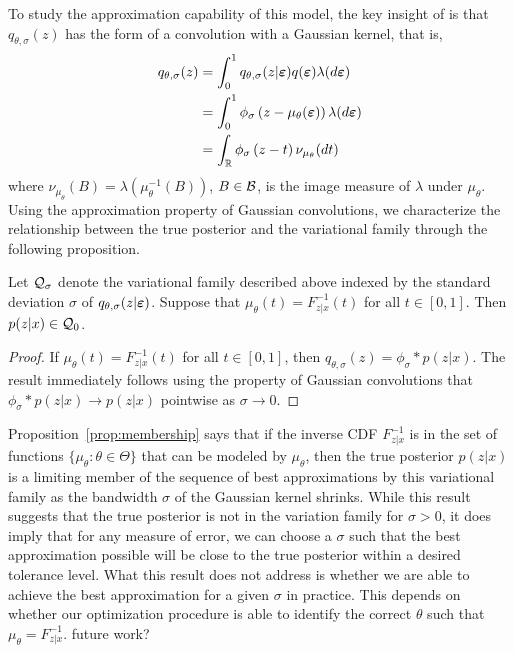 \documentclass[10pt]{article}
\begin{document}
To study the approximation capability of this model, the key insight of \citet{Plummer:2021} is that $q_{\theta,\sigma}(z)$ has the form of a convolution with a Gaussian kernel, that is,
\begin{align*}
q_{\theta,\sigma}(z) &= \int_0^1 q_{\theta,\sigma}(z|\bm{\varepsilon})q(\bm{\varepsilon})\lambda(d\bm{\varepsilon}) \\
&= \int_0^1 \phi_\sigma\left(z-\mu_\theta(\bm{\varepsilon})\right)\lambda(d\bm{\varepsilon}) \\
&= \int_{\mathbb{R}} \phi_\sigma\left(z-t\right)\nu_{\mu_\theta}(dt)
\end{align*}
where $\nu_{\mu_\theta}(B)=\lambda\left(\mu_\theta^{-1}(B)\right)$, $B\in\mathcal{B}$, is the image measure of $\lambda$ under $\mu_\theta$. Using the approximation property of Gaussian convolutions, we characterize the relationship between the true posterior and the variational family through the following proposition.

\begin{proposition} \label{prop:membership}
Let $\mathcal{Q}_\sigma$ denote the variational family described above indexed by the standard deviation $\sigma$ of $q_{\theta,\sigma}(z|\bm{\varepsilon})$. Suppose that $\mu_\theta(t)=F_{z|x}^{-1}(t)$ for all $t\in[0,1]$. Then $p(z|x)\in\mathcal{Q}_0$.
\end{proposition}
\begin{proof}
If $\mu_\theta(t)=F_{z|x}^{-1}(t)$ for all $t\in[0,1]$, then $q_{\theta,\sigma}(z) = \phi_\sigma*p(z|x)$. The result immediately follows using the property of Gaussian convolutions that $\phi_\sigma*p(z|x)\rightarrow p(z|x)$ pointwise as $\sigma\rightarrow0$.
\end{proof}

Proposition~\ref{prop:membership} says that if the inverse CDF $F_{z|x}^{-1}$ is in the set of functions $\{\mu_\theta:\theta\in\Theta\}$ that can be modeled by $\mu_\theta$, then the true posterior $p(z|x)$ is a limiting member of the sequence of best approximations by this variational family as the bandwidth $\sigma$ of the Gaussian kernel shrinks. While this result suggests that the true posterior is not in the variation family for $\sigma>0$, it does imply that for any measure of error, we can choose a $\sigma$ such that the best approximation possible will be close to the true posterior within a desired tolerance level. What this result does not address is whether we are able to achieve the best approximation for a given $\sigma$ in practice. This depends on whether our optimization procedure is able to identify the correct $\theta$ such that $\mu_\theta=F_{z|x}^{-1}$. \todo future work?
\\
\end{document}

